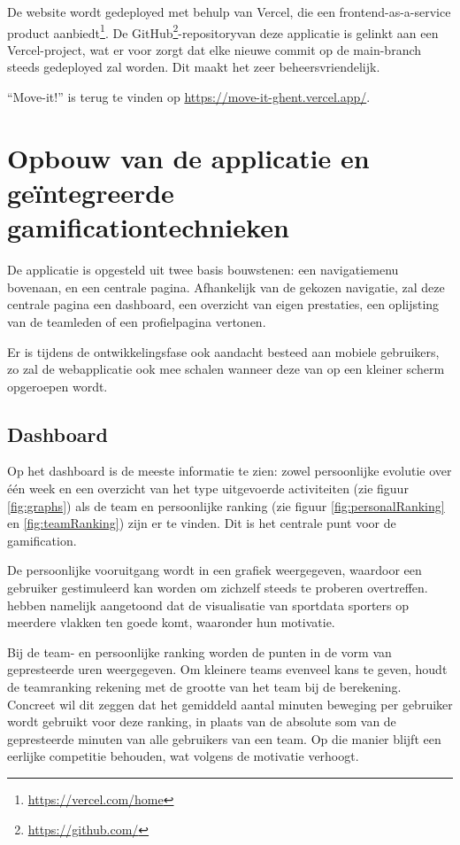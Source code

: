 De website wordt gedeployed met behulp van Vercel, die een frontend-as-a-service product aanbiedt\footnote{\href{https://vercel.com/home}{https://vercel.com/home}}. De GitHub\footnote{\href{https://github.com/}{https://github.com/}}-repositoryvan deze applicatie is gelinkt aan een Vercel-project, wat er voor zorgt dat elke nieuwe commit op de main-branch steeds gedeployed zal worden. Dit maakt het zeer beheersvriendelijk.

``Move-it!'' is terug te vinden op \href{https://move-it-ghent.vercel.app/}{https://move-it-ghent.vercel.app/}.

\section{Opbouw van de applicatie en geïntegreerde gamificationtechnieken}

De applicatie is opgesteld uit twee basis bouwstenen: een navigatiemenu bovenaan, en een centrale pagina. Afhankelijk van de gekozen navigatie, zal deze centrale pagina een dashboard, een overzicht van eigen prestaties, een oplijsting van de teamleden of een profielpagina vertonen.

Er is tijdens de ontwikkelingsfase ook aandacht besteed aan mobiele gebruikers, zo zal de webapplicatie ook mee schalen wanneer deze van op een kleiner scherm opgeroepen wordt.

\subsection{Dashboard}
Op het dashboard is de meeste informatie te zien: zowel persoonlijke evolutie over één week en een overzicht van het type uitgevoerde activiteiten (zie figuur \ref{fig:graphs}) als de team en persoonlijke ranking (zie figuur \ref{fig:personalRanking} en \ref{fig:teamRanking}) zijn er te vinden. Dit is het centrale punt voor de gamification.

De persoonlijke vooruitgang wordt in een grafiek weergegeven, waardoor een gebruiker gestimuleerd kan worden om zichzelf steeds te proberen overtreffen. \linebreak \textcite{Schiewe2020} hebben namelijk aangetoond dat de visualisatie van sportdata sporters op meerdere vlakken ten goede komt, waaronder hun motivatie.

Bij de team- en persoonlijke ranking worden de punten in de vorm van gepresteerde uren weergegeven. Om kleinere teams evenveel kans te geven, houdt de teamranking rekening met de grootte van het team bij de berekening. Concreet wil dit zeggen dat het gemiddeld aantal minuten beweging per gebruiker wordt gebruikt voor deze ranking, in plaats van de absolute som van de gepresteerde minuten van alle gebruikers van een team. Op die manier blijft een eerlijke competitie behouden, wat volgens \textcite{Ivanova2019} de motivatie verhoogt.

